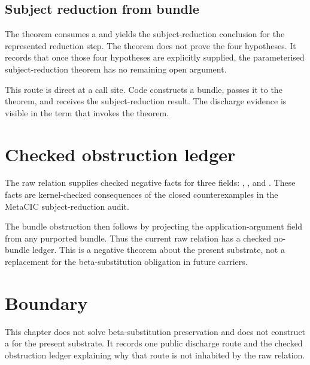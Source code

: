 \subsection{Subject reduction from bundle}
\label{subsec:sr-discharge-routes-subject-reduction-from-bundle}

The theorem
consumes a
and yields the subject-reduction conclusion for the represented reduction
step.  The theorem does not prove the four hypotheses.  It records that
once those four hypotheses are explicitly supplied, the parameterised
subject-reduction theorem has no remaining open argument.

This route is direct at a call site.  Code constructs a bundle, passes it
to the theorem, and receives the subject-reduction result.  The discharge
evidence is visible in the term that invokes the theorem.

\section{Checked obstruction ledger}
\label{sec:sr-discharge-routes-obstruction-ledger}

The raw relation supplies checked negative facts for three fields:
,
, and
.  These facts
are kernel-checked consequences of the closed counterexamples in the
MetaCIC subject-reduction audit.

The bundle obstruction
then follows by projecting the application-argument field from any
purported bundle.  Thus the current raw relation has a checked no-bundle
ledger.  This is a negative theorem about the present substrate, not a
replacement for the beta-substitution obligation in future carriers.

\section{Boundary}
\label{sec:sr-discharge-routes-boundary}

This chapter does not solve beta-substitution preservation and does not
construct a
for the present substrate.  It records one public discharge route and the
checked obstruction ledger explaining why that route is not inhabited by
the raw relation.

